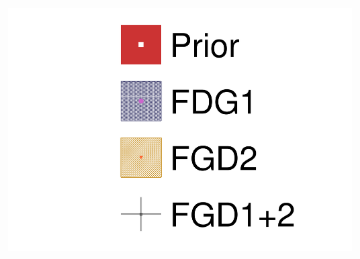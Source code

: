 \begin{figure}[h]
	\centering
	\begin{subfigure}[t]{0.10\textwidth}
		\includegraphics[width=\textwidth,page=1, trim={0mm 0mm 0mm 9mm}, clip]{figures/mach3/2018/data/2018a_FixedCov_RedCov_Mpi_FGD1Only_Data_merge_2018a_FixedCov_RedCov_Mpi_FGD2Only_Data_merge_2018a_FixedCov_RedCov_Mpi_Data_merge}
	\end{subfigure}
	

\end{figure}
